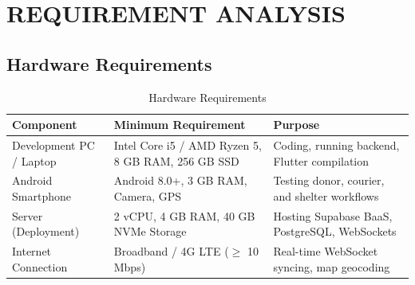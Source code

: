 \documentclass[12pt,a4paper]{article}
\begin{document}
\newpage
\section{REQUIREMENT ANALYSIS}

\subsection{Hardware Requirements}
\begin{table}[H]
\centering
\caption{Hardware Requirements}
\label{tab:hardware_req}
\begin{tabularx}{\textwidth}{|l|X|X|}
    \hline
    \textbf{Component} & \textbf{Minimum Requirement} & \textbf{Purpose} \\
    \hline
    Development PC / Laptop & Intel Core i5 / AMD Ryzen 5, 8 GB RAM, 256 GB SSD & Coding, running backend, Flutter compilation \\
    \hline
    Android Smartphone & Android 8.0+, 3 GB RAM, Camera, GPS & Testing donor, courier, and shelter workflows \\
    \hline
    Server (Deployment) & 2 vCPU, 4 GB RAM, 40 GB NVMe Storage & Hosting Supabase BaaS, PostgreSQL, WebSockets \\
    \hline
    Internet Connection & Broadband / 4G LTE ($\ge$ 10 Mbps) & Real-time WebSocket syncing, map geocoding \\
    \hline
\end{tabularx}
\end{table}
\end{document}

